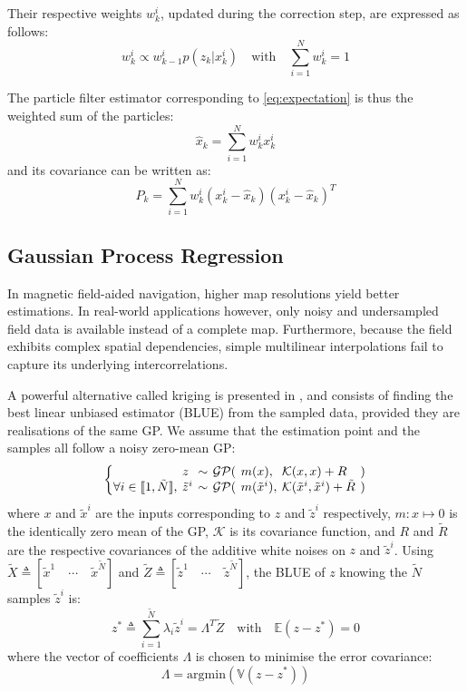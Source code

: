 \documentclass[conference]{IEEEtran}
\begin{document}
Their respective weights $w_k^i$, updated during the correction step, are expressed as follows:
\begin{equation}
w_k^i\propto w_{k-1}^ip(z_k|x_k^i)\quad\text{with}\textstyle \quad\sum_{i=1}^Nw_k^i=1
\end{equation}

The particle filter estimator corresponding to \eqref{eq:expectation} is thus the weighted sum of the particles:
\begin{equation}
\textstyle \hat{x}_k=\sum_{i=1}^Nw_k^ix_k^i
\end{equation}
and its covariance can be written as:
\begin{equation}
\textstyle P_k=\sum_{i=1}^Nw_k^i(x_k^i-\hat{x}_k)(x_k^i-\hat{x}_k)^T
\end{equation}

\subsection{Gaussian Process Regression}\label{sec:GPR}

In magnetic field-aided navigation, higher map resolutions yield better estimations. In real-world applications however, only noisy and undersampled field data is available instead of a complete map. Furthermore, because the field exhibits complex spatial dependencies, simple multilinear interpolations fail to capture its underlying intercorrelations.

A powerful alternative called kriging is presented in \cite{bib:Rasmussen}, and consists of finding the best linear unbiased estimator (BLUE) from the sampled data, provided they are realisations of the same GP. We assume that the estimation point and the samples all follow a noisy zero-mean GP:
\begin{equation}
\setlength\arraycolsep{2pt}\left\{
\begin{matrix*}[l]
&z&\sim&\mathcal{GP}(&m(x),&\mathcal{K}(x,x)+R&)\\
\forall i\in[\![1,\tilde{N}]\!],&\tilde{z}^i&\sim&\mathcal{GP}(&m(\tilde{x}^i),&\mathcal{K}(\tilde{x}^i,\tilde{x}^i)+\tilde{R}&)
\end{matrix*}\right.
\end{equation}
where $x$ and $\tilde{x}^i$ are the inputs corresponding to $z$ and $\tilde{z}^i$ respectively, $m:x\mapsto0$ is the identically zero mean of the GP, $\mathcal{K}$ is its covariance function, and $R$ and $\tilde{R}$ are the respective covariances of the additive white noises on $z$ and $\tilde{z}^i$. Using $\tilde{X}\triangleq[\tilde{x}^1\quad\cdots\quad\tilde{x}^{\tilde{N}}]$ and $\tilde{Z}\triangleq[\tilde{z}^1\quad\cdots\quad\tilde{z}^{\tilde{N}}]$, the BLUE of $z$ knowing the $\tilde{N}$ samples $\tilde{z}^i$ is:
\begin{equation}
\textstyle z^*\triangleq\sum_{i=1}^{\tilde{N}}\lambda_i\tilde{z}^i=\Lambda^T\tilde{Z}\quad\text{with}\quad\mathbb{E}(z-z^*)=0
\end{equation}
where the vector of coefficients $\Lambda$ is chosen to minimise the error covariance:
\begin{equation}
\Lambda=\text{argmin}(\mathbb{V}(z-z^*))\label{eq:minimum covariance}
\end{equation}
\end{document}
